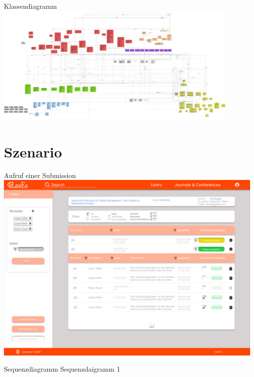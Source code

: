 \documentclass{beamer}
\begin{document}
    \begin{frame}{Klassendiagramm}
        \centering
        \includegraphics[width=0.9\textwidth]{../../docs/Entwurf/graphics/klassendiagramm_png.png}
    \end{frame}



    \section{Szenario}
    \begin{frame}{Aufruf einer Submission}
        \centering
        \includegraphics[width=\textwidth]{../../docs/Pflichtenheft/graphics/Submission-png.png}
    \end{frame}

    \begin{frame}{Sequenzdiagramm}
        \centering
        Sequenzdaigramm 1
    \end{frame}
\end{document}
